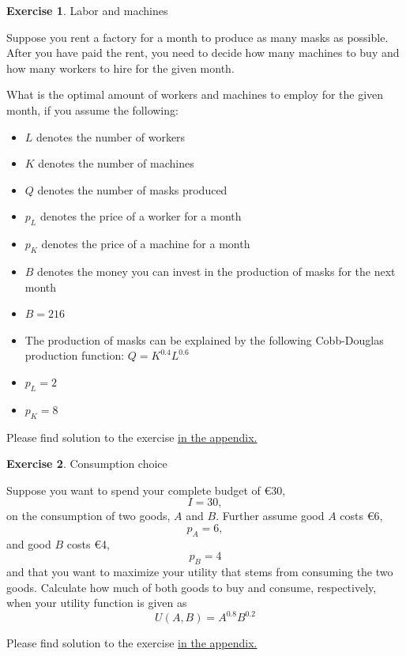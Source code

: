 \documentclass[
  12pt,
  oneside]{book}
\providecommand{\tightlist}{%
  \setlength{\itemsep}{0pt}\setlength{\parskip}{0pt}}
\theoremstyle{definition}
\theoremstyle{definition}
\theoremstyle{definition}
\newtheorem{exercise}{Exercise}[chapter]
\theoremstyle{definition}
\theoremstyle{remark}
\begin{document}
\begin{exercise}
\protect\hypertarget{exr:lama}{}\label{exr:lama}Labor and machines

Suppose you rent a factory for a month to produce as many masks as possible. After you have paid the rent, you need to decide how many machines to buy and how many workers to hire for the given month.

What is the optimal amount of workers and machines to employ for the given month, if you assume the following:

\begin{itemize}
\tightlist
\item
  \(L\) denotes the number of workers
\item
  \(K\) denotes the number of machines
\item
  \(Q\) denotes the number of masks produced
\item
  \(p_L\) denotes the price of a worker for a month
\item
  \(p_K\) denotes the price of a machine for a month
\item
  \(B\) denotes the money you can invest in the production of masks for the next month
\item
  \(B = 216\)
\item
  The production of masks can be explained by the following Cobb-Douglas production function: \(Q = K^{0.4}L^{0.6}\)
\item
  \(p_L = 2\)
\item
  \(p_K = 8\)
\end{itemize}

Please find solution to the exercise \protect\hyperlink{sol:lama}{in the appendix.}
\end{exercise}

\begin{exercise}
\protect\hypertarget{exr:cchoice}{}\label{exr:cchoice}Consumption choice

Suppose you want to spend your complete budget of €30, \[I=30,\] on the
consumption of two goods, \(A\) and \(B\). Further assume good \(A\) costs €6, \[p_A=6,\]
and good \(B\) costs €4, \[p_B=4\] and that you want to maximize your utility that
stems from consuming the two goods.
Calculate how much of both goods to buy and consume, respectively, when your utility function
is given as \[U(A,B)=A^{0.8}B^{0.2}\]

Please find solution to the exercise \protect\hyperlink{sol:cchoice}{in the appendix.}
\end{exercise}
\end{document}
